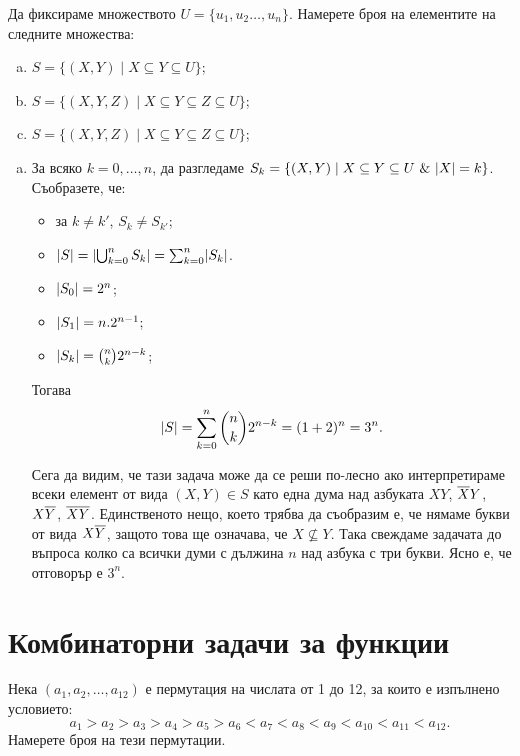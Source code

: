 \begin{problem}
  Да фиксираме множеството $U = \{u_1,u_2\dots,u_n\}$.
  Намерете броя на елементите на следните множества:
  \begin{enumerate}[a)]
  \item 
    $S = \{(X,Y) \mid X \subseteq Y \subseteq U\}$;
  \item
    $S = \{(X,Y,Z) \mid X \subseteq Y \subseteq Z \subseteq U\}$;
  \item
    $S = \{(X,Y,Z) \mid X \subseteq Y \subseteq Z \subseteq U\}$;
  \end{enumerate}
\end{problem}
\begin{hint}
  \begin{enumerate}[a)]
  \item 
    За всяко $k = 0,\dots,n$, да разгледаме
    $S_k = \{(X,Y) \mid X \subseteq Y \subseteq U\ \&\ \lvert{X}\rvert = k\}$.
    Съобразете, че:
    \begin{itemize}
    \item 
      за $k \neq k'$, $S_k \neq S_{k'}$;
    \item
      $\lvert{S}\rvert = \lvert{\bigcup^n_{k=0} S_k}\rvert = \sum^n_{k=0}\lvert{S_k}\rvert$.
    \item
      $\lvert{S_0}\rvert = 2^n$;
    \item
      $\lvert{S_1}\rvert = n.2^{n-1}$;
    \item
      $\lvert{S_k}\rvert = \binom{n}{k}2^{n-k}$;
    \end{itemize}
    Тогава 
    \[\lvert{S}\rvert = \sum^n_{k=0} \binom{n}{k}2^{n-k} = (1+2)^n = 3^n.\]
    
    Сега да видим, че тази задача може да се реши по-лесно ако интерпретираме всеки елемент от вида $(X,Y) \in S$
    като една дума над азбуката $XY$, $\overline{X}Y$, $X\overline{Y}$, $\overline{X}\overline{Y}$.
    Единственото нещо, което трябва да съобразим е, че нямаме букви от вида $X\overline{Y}$, защото това ще означава, че 
    $X \not\subseteq Y$. Така свеждаме задачата до въпроса колко са всички думи с дължина $n$ над азбука с три букви.
    Ясно е, че отговорър е $3^n$.
  \end{enumerate}
  
\end{hint}


\section{Комбинаторни задачи за функции}

\begin{problem}
  Нека $(a_1,a_2,\dots,a_{12})$ е пермутация на числата от 1 до 12, за които е изпълнено условието:
  \[a_1 > a_2 > a_3 > a_4 > a_5 > a_6 < a_7 < a_8 < a_9 < a_{10} < a_{11} < a_{12}.\]
  Намерете броя на тези пермутации.  
\end{problem}

